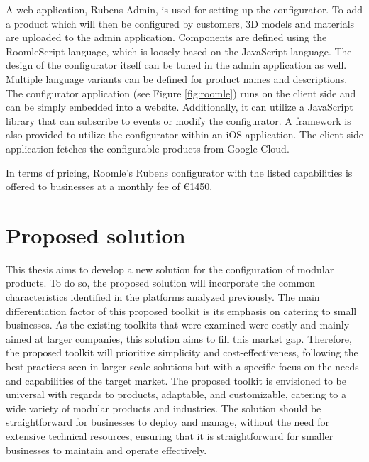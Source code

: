 A web application, Rubens Admin, is used for setting up the configurator. To add a product which will then be configured by customers, 3D models and materials are uploaded to the admin application. Components are defined using the RoomleScript language, which is loosely based on the JavaScript language. The design of the configurator itself can be tuned in the admin application as well. Multiple language variants can be defined for product names and descriptions. The configurator application (see Figure \ref{fig:roomle}) runs on the client side and can be simply embedded into a website. Additionally, it can utilize a JavaScript library that can subscribe to events or modify the configurator. A framework is also provided to utilize the configurator within an iOS application. The client-side application fetches the configurable products from Google Cloud. \cite{RoomleDocumentation}

In terms of pricing, Roomle's Rubens configurator with the listed capabilities is offered to businesses at a monthly fee of €1450. \cite{RoomleFullLogic}



\section{Proposed solution}

This thesis aims to develop a new solution for the configuration of modular products. To do so, the proposed solution will incorporate the common characteristics identified in the platforms analyzed previously. The main differentiation factor of this proposed toolkit is its emphasis on catering to small businesses. As the existing toolkits that were examined were costly and mainly aimed at larger companies, this solution aims to fill this market gap. Therefore, the proposed toolkit will prioritize simplicity and cost-effectiveness, following the best practices seen in larger-scale solutions but with a specific focus on the needs and capabilities of the target market.
The proposed toolkit is envisioned to be universal with regards to products, adaptable, and customizable, catering to a wide variety of modular products and industries. The solution should be straightforward for businesses to deploy and manage, without the need for extensive technical resources, ensuring that it is straightforward for smaller businesses to maintain and operate effectively.


